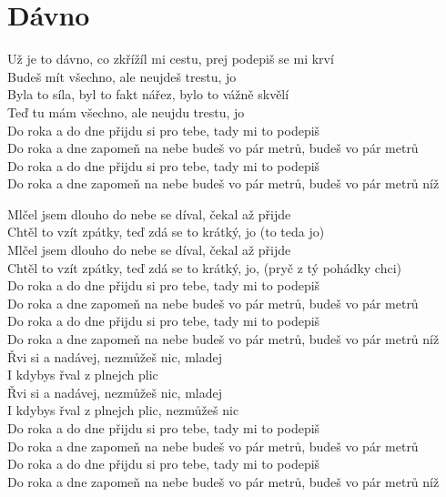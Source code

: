\section{Dávno}
\onehalfspacing

Už je to dávno, co zkřížíl mi cestu, prej podepiš se mi krví \\
Budeš mít všechno, ale neujdeš trestu, jo \\
Byla to síla, byl to fakt nářez, bylo to vážně skvělí \\
Teď tu mám všechno, ale neujdu trestu, jo \\

Do roka a do dne přijdu si pro tebe, tady mi to podepiš \\
Do roka a dne zapomeň na nebe budeš vo pár metrů, budeš vo pár metrů \\
Do roka a do dne přijdu si pro tebe, tady mi to podepiš \\
Do roka a dne zapomeň na nebe budeš vo pár metrů, budeš vo pár metrů níž \\

\singlespacing

\sloka
Mlčel jsem dlouho do nebe se díval, čekal až přijde \\
Chtěl to vzít zpátky, teď zdá se to krátký, jo (to teda jo) \\
Mlčel jsem dlouho do nebe se díval, čekal až přijde \\
Chtěl to vzít zpátky, teď zdá se to krátký, jo, (pryč z tý pohádky chci) \\

Do roka a do dne přijdu si pro tebe, tady mi to podepiš \\
Do roka a dne zapomeň na nebe budeš vo pár metrů, budeš vo pár metrů \\
Do roka a do dne přijdu si pro tebe, tady mi to podepiš \\
Do roka a dne zapomeň na nebe budeš vo pár metrů, budeš vo pár metrů níž \\

\sloka
Řvi si a nadávej, nezmůžeš nic, mladej \\
I kdybys řval z plnejch plic \\
Řvi si a nadávej, nezmůžeš nic, mladej \\
I kdybys řval z plnejch plic, nezmůžeš nic \\

Do roka a do dne přijdu si pro tebe, tady mi to podepiš \\
Do roka a dne zapomeň na nebe budeš vo pár metrů, budeš vo pár metrů \\
Do roka a do dne přijdu si pro tebe, tady mi to podepiš \\
Do roka a dne zapomeň na nebe budeš vo pár metrů, budeš vo pár metrů níž \\

